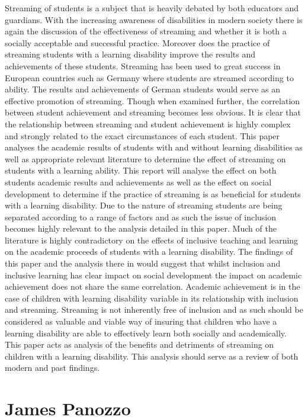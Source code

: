 \documentclass[twoside,12pt,a4paper,notitlepage]{memoir}
\begin{document}
Streaming of students is a subject that is heavily debated by both educators and guardians. With the increasing awareness of disabilities in modern society there is again the discussion of the effectiveness of streaming and whether it is both a socially acceptable and successful practice. Moreover does the practice of streaming students with a learning disability improve the results and achievements of these students. Streaming has been used to great success in European countries such as Germany where students are streamed according to ability. The results and achievements of German students would serve as an effective promotion of streaming. Though when examined further, the correlation between student achievement and streaming becomes less obvious. It is clear that the relationship between streaming and student achievement is highly complex and strongly related to the exact circumstances of each student. This paper analyses the academic results of students with and without learning disabilities as well as appropriate relevant literature to determine the effect of streaming on students with a learning ability. This report will analyse the effect on both students academic results and achievements as well as the effect on social development to determine if the practice of streaming is as beneficial for students with a learning disability. Due to the nature of streaming students are being separated according to a range of factors and as such the issue of inclusion becomes highly relevant to the analysis detailed in this paper. Much of the literature is highly contradictory on the effects of inclusive teaching and learning on the academic proceeds of students with a learning disability. The findings of this paper and the analysis there in would suggest that whilst inclusion and inclusive learning has clear impact on social development the impact on academic achievement does not share the same correlation. Academic achievement is in the case of children with learning disability variable in its relationship with inclusion and streaming. Streaming is not inherently free of inclusion and as such should be considered as valuable and viable way of insuring that children who have a learning disability are able to effectively learn both socially and academically. This paper acts as analysis of the benefits and detriments of streaming on children with a learning disability. This analysis should serve as a review of both modern and past findings. 

\section*{James Panozzo}
\end{document}
